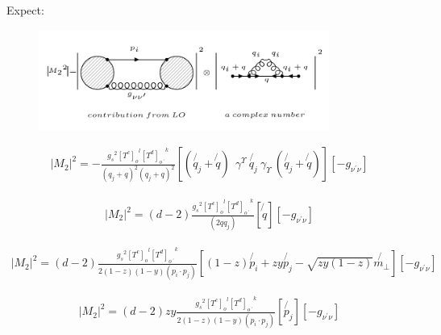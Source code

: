 Expect:
\begin{figure}[h!]
\centering
\includegraphics[width=0.85\textwidth]{images/expectationqg-g.png}
\end{figure}

\begin{equation}
\begin{split}
|M_2|^2=-\frac{{g_s}^2 {[T^c]_o}^l {[T^d]_{o\:^{\prime}}}^k}{(q_j + q)^2 (q_j + q)^2}
[(\not{q_j} + \not{q}) \:
 \:  \gamma^{\Upsilon} \: \not{q_j} \: 
{\gamma}_{\Upsilon} \: (\not{q_j} + \not{q})]
[-g_{{\nu}^{\prime}{\nu}}]
\end{split}
\end{equation}

\begin{equation}
\begin{split}
|M_2|^2=(d-2)\frac{{g_s}^2 {[T^c]_o}^l {[T^d]_{o\:^{\prime}}}^k}{(2qq_j)}
[\not{q}]
[-g_{{\nu}^{\prime}{\nu}}]
\end{split}
\end{equation}

\begin{equation}
\begin{split}
|M_2|^2=(d-2)\frac{{g_s}^2 {[T^c]_o}^l {[T^d]_{o\:^{\prime}}}^k}{2(1-z)(1-y)(p_i \cdot p_j)}
[(1-z) \not{p_i}+zy \not{p_j} - \sqrt{zy(1-z)} \not{{m}_{\bot}}]
[-g_{{\nu}^{\prime}{\nu}}]
\end{split}
\end{equation}

\begin{equation}
\begin{split}
|M_2|^2=(d-2)zy\frac{{g_s}^2 {[T^c]_o}^l {[T^d]_{o\:^{\prime}}}^k}{2(1-z)(1-y)(p_i \cdot p_j)}
[\not{p_j}]
[-g_{{\nu}^{\prime}{\nu}}]
\end{split}
\end{equation}







